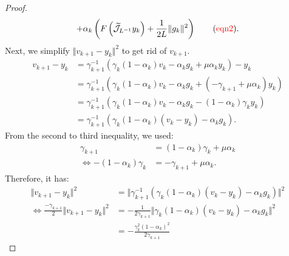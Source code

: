 \documentclass[12pt]{article}
\begin{document}
\begin{proof}
\begin{align*}
            + 
            \alpha_k\left(
                F\left(\widetilde{\mathcal J}_{L^{-1}} y_k\right) 
                + 
                \frac{1}{2L} \Vert g_k\Vert^2
            \right)
            \tag{\textcolor{red}{\text{eqn2}}}. 
        \end{align*}
        Next, we simplify $\Vert v_{k + 1} - y_k\Vert^2$ to get rid of $v_{k + 1}$. 
        \begin{align*}
            v_{k + 1} - y_k 
            &= 
            \gamma_{k + 1}^{-1}
            \left(
                \gamma_k(1 - \alpha_k) v_k - \alpha_k g_k + \mu \alpha_k y_k
            \right) - y_k
            \\
            &= 
            \gamma_{k + 1}^{-1}
            \left(
                \gamma_k(1 - \alpha_k)v_k - \alpha_k g_k 
                + (-\gamma_{k + 1} + \mu\alpha_k)y_k
            \right)
            \\
            &=
            \gamma_{k + 1}^{-1}
            \left(
                \gamma_k(1 - \alpha_k)v_k - \alpha_k g_k - 
                (1 - \alpha_k)\gamma_ky_k
            \right)
            \\
            &= 
            \gamma_{k + 1}^{-1}(
                \gamma_k(1 - \alpha_k)(v_k - y_k) 
                - \alpha_k g_k
            ).
        \end{align*}
        From the second to third inequality, we used: 
        \begin{align*}
            \gamma_{k + 1} &=    
                (1 - \alpha_k)\gamma_k + \mu \alpha_k
                \\
                \iff 
                -(1 - \alpha_k)\gamma_k
                &= - \gamma_{k + 1} + \mu \alpha_k. 
        \end{align*}
        Therefore, it has: 
        {\footnotesize
        \begin{align*}
            \Vert v_{k + 1} - y_k\Vert^2 
            &= 
            \Vert 
                \gamma_{k + 1}^{-1}(
                    \gamma_k(1 - \alpha_k)(v_k - y_k) 
                    - \alpha_k g_k
                )
            \Vert^2
            \\
            \iff 
            \frac{- \gamma_{k + 1}}{2}
            \Vert v_{k + 1} - y_k\Vert^2
            &= 
            - \frac{1}{2\gamma_{k + 1}}
            \Vert 
                \gamma_k(1 - \alpha_k)(v_k - y_k) - \alpha_k g_k
            \Vert^2
            \\
            &= 
            -\frac{\gamma_k^2 (1 - \alpha_k)^2}{2 \gamma_{k + 1}} 

\end{align*}}
\end{proof}
\end{document}
